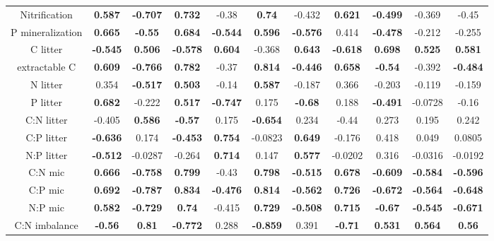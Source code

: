 \documentclass[10pt]{article}
\begin{document}
\begin{table}[h!]
\begin{center}
{\begin{tabular}{ccccccccccc}
  Nitrification & \textbf{ 0.587 } & \textbf{ -0.707 } & \textbf{ 0.732 } & -0.38 & \textbf{ 0.74 } & -0.432 & \textbf{ 0.621 } & \textbf{ -0.499 } & -0.369 & -0.45 \\ 
  P mineralization & \textbf{ 0.665 } & \textbf{ -0.55 } & \textbf{ 0.684 } & \textbf{ -0.544 } & \textbf{ 0.596 } & \textbf{ -0.576 } & 0.414 & \textbf{ -0.478 } & -0.212 & -0.255 \\ 
  C litter & \textbf{ -0.545 } & \textbf{ 0.506 } & \textbf{ -0.578 } & \textbf{ 0.604 } & -0.368 & \textbf{ 0.643 } & \textbf{ -0.618 } & \textbf{ 0.698 } & \textbf{ 0.525 } & \textbf{ 0.581 } \\ 
  extractable C & \textbf{ 0.609 } & \textbf{ -0.766 } & \textbf{ 0.782 } & -0.37 & \textbf{ 0.814 } & \textbf{ -0.446 } & \textbf{ 0.658 } & \textbf{ -0.54 } & -0.392 & \textbf{ -0.484 } \\ 
  N litter & 0.354 & \textbf{ -0.517 } & \textbf{ 0.503 } & -0.14 & \textbf{ 0.587 } & -0.187 & 0.366 & -0.203 & -0.119 & -0.159 \\ 
  P litter & \textbf{ 0.682 } & -0.222 & \textbf{ 0.517 } & \textbf{ -0.747 } & 0.175 & \textbf{ -0.68 } & 0.188 & \textbf{ -0.491 } & -0.0728 & -0.16 \\ 
  C:N litter & -0.405 & \textbf{ 0.586 } & \textbf{ -0.57 } & 0.175 & \textbf{ -0.654 } & 0.234 & -0.44 & 0.273 & 0.195 & 0.242 \\ 
  C:P litter & \textbf{ -0.636 } & 0.174 & \textbf{ -0.453 } & \textbf{ 0.754 } & -0.0823 & \textbf{ 0.649 } & -0.176 & 0.418 & 0.049 & 0.0805 \\ 
  N:P litter & \textbf{ -0.512 } & -0.0287 & -0.264 & \textbf{ 0.714 } & 0.147 & \textbf{ 0.577 } & -0.0202 & 0.316 & -0.0316 & -0.0192 \\ 
  C:N mic & \textbf{ 0.666 } & \textbf{ -0.758 } & \textbf{ 0.799 } & -0.43 & \textbf{ 0.798 } & \textbf{ -0.515 } & \textbf{ 0.678 } & \textbf{ -0.609 } & \textbf{ -0.584 } & \textbf{ -0.596 } \\ 
  C:P mic & \textbf{ 0.692 } & \textbf{ -0.787 } & \textbf{ 0.834 } & \textbf{ -0.476 } & \textbf{ 0.814 } & \textbf{ -0.562 } & \textbf{ 0.726 } & \textbf{ -0.672 } & \textbf{ -0.564 } & \textbf{ -0.648 } \\ 
  N:P mic & \textbf{ 0.582 } & \textbf{ -0.729 } & \textbf{ 0.74 } & -0.415 & \textbf{ 0.729 } & \textbf{ -0.508 } & \textbf{ 0.715 } & \textbf{ -0.67 } & \textbf{ -0.545 } & \textbf{ -0.671 } \\ 
  C:N imbalance & \textbf{ -0.56 } & \textbf{ 0.81 } & \textbf{ -0.772 } & 0.288 & \textbf{ -0.859 } & 0.391 & \textbf{ -0.71 } & \textbf{ 0.531 } & \textbf{ 0.564 } & \textbf{ 0.56 } \\ 

\end{tabular}}
\end{center}
\end{table}
\end{document}
